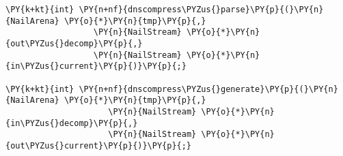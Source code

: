 \begin{Verbatim}[commandchars=\\\{\},codes={\catcode`\$=3\catcode`\^=7\catcode`\_=8}]
\PY{k+kt}{int} \PY{n+nf}{dnscompress\PYZus{}parse}\PY{p}{(}\PY{n}{NailArena} \PY{o}{*}\PY{n}{tmp}\PY{p}{,}
                  \PY{n}{NailStream} \PY{o}{*}\PY{n}{out\PYZus{}decomp}\PY{p}{,}
                  \PY{n}{NailStream} \PY{o}{*}\PY{n}{in\PYZus{}current}\PY{p}{)}\PY{p}{;}

\PY{k+kt}{int} \PY{n+nf}{dnscompress\PYZus{}generate}\PY{p}{(}\PY{n}{NailArena} \PY{o}{*}\PY{n}{tmp}\PY{p}{,}
                     \PY{n}{NailStream} \PY{o}{*}\PY{n}{in\PYZus{}decomp}\PY{p}{,}
                     \PY{n}{NailStream} \PY{o}{*}\PY{n}{out\PYZus{}current}\PY{p}{)}\PY{p}{;}
\end{Verbatim}
